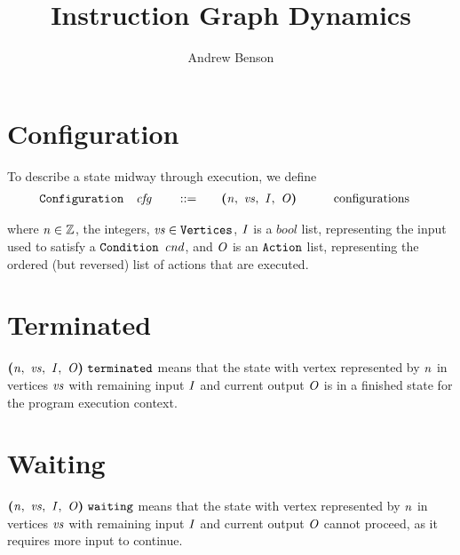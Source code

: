 \documentclass[12pt]{article}
\title{Instruction Graph Dynamics}
\author{Andrew Benson}
\date{}
\begin{document}
\maketitle

\thispagestyle{simple}
\section{Configuration}

To describe a state midway through execution, we define
\begin{alignat*}{4}
  \sort{Configuration}\quad
    &\nterm{cfg}\quad & &::=\quad &
      &\cfg{\nterm{n}}{\nterm{vs}}{\nterm{I}}{\nterm{O}}\qquad &
        &\text{configurations}
\end{alignat*}

where $\nterm{n} \in \mathbb{Z}$, the integers, $\nterm{vs} \in
\sort{Vertices}$, $\nterm{I}$ is a $bool$ list, representing the input used to
satisfy a $\sort{Condition}$ $\nterm{cnd}$, and $\nterm{O}$ is an
$\sort{Action}$ list, representing the ordered (but reversed) list of actions
that are executed.\\

\section{Terminated}

$\terminated{\cfg{\nterm{n}}{\nterm{vs}}{\nterm{I}}{\nterm{O}}}$ means that the
state with vertex represented by $\nterm{n}$ in vertices $\nterm{vs}$ with
remaining input $\nterm{I}$ and current output $\nterm{O}$ is in a finished
state for the program execution context.

\begin{mathpar}
\end{mathpar}

\section{Waiting}

$\waiting{\cfg{\nterm{n}}{\nterm{vs}}{\nterm{I}}{\nterm{O}}}$ means that the
state with vertex represented by $\nterm{n}$ in vertices $\nterm{vs}$ with
remaining input $\nterm{I}$ and current output $\nterm{O}$ cannot proceed, as it
requires more input to continue.

\begin{mathpar}

\end{mathpar}
\end{document}

